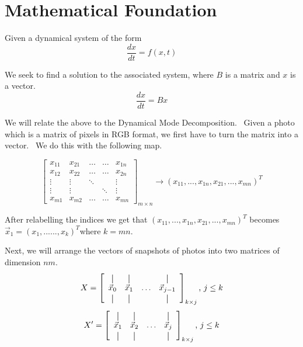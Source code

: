 \documentclass[12pt]{report}
\begin{document}
\chapter{Mathematical Foundation}
{\normalsize \bigskip }
{\normalsize Given a dynamical system of the form }
{\normalsize 
\[
\frac{dx}{dt}=f(x,t) 
\]
}

We seek to find a solution to the associated system, where $B$ is a matrix and $x$ is a vector.
{\normalsize 
\[
\frac{dx}{dt}=Bx
\]%
}

{\normalsize We will relate the above to the Dynamical Mode Decomposition. \
Given a photo which is a matrix of pixels in RGB format, we first have to turn
the matrix into a vector. \ We do this with the following map. \ }

{\normalsize 
\[
\left[ 
\begin{array}{ccccc}
x_{11} & x_{21} & \dots & \dots & x_{1n} \\ 
x_{12} & x_{22} & \dots & \dots & x_{2n} \\ 
\vdots & \vdots & \ddots &  & \vdots \\ 
\vdots & \vdots &  & \ddots & \vdots \\ 
x_{m1} & x_{m2} & \dots & \dots & x_{mn}%
\end{array}%
\right]_{m\times n} \longrightarrow \left( x_{11},...,x_{1n},x_{21},...,x_{mn}\right)
^{T}
\]%
}

After relabelling the indices we get that $\left(
x_{11},...,x_{1n},x_{21},...,x_{mn}\right) ^{T}$ becomes $\vec{x}_1 = \left(
x_{1},......,x_{k}\right) ^{T}$where $k=mn$.

Next, we will arrange the vectors of snapshots of photos into
two matrices of dimension $nm$.
\begin{equation}
X = 
\left[
  \begin{array}{cccc}
    \vertbar & \vertbar &        & \vertbar \\
    \vec{x}_{0}    & \vec{x}_{1}    & \ldots & \vec{x}_{j-1}    \\
    \vertbar & \vertbar &        & \vertbar 
  \end{array}
\right]_{k\times j}
\text{, }j\leq k\\
\end{equation}
\begin{equation}
X' = 
\left[
  \begin{array}{cccc}
    \vertbar & \vertbar &        & \vertbar \\
    \vec{x}_{1}    & \vec{x}_{2}    & \ldots & \vec{x}_{j}    \\
    \vertbar & \vertbar &        & \vertbar 
  \end{array}
\right]_{k\times j}
\text{, }j\leq k\\
\end{equation}
\end{document}
